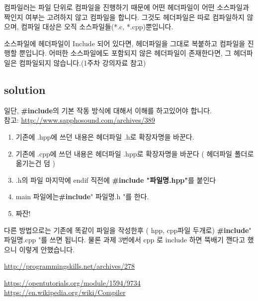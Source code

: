 \documentclass{oblivoir}
\begin{document}
컴파일러는 파일 단위로 컴파일을 진행하기 때문에 어떤 헤더파일이 어떤 소스파일과 짝인지 여부는 고려하지 않고 컴파일을 합니다. 그것도 헤더파일은 따로 컴파일하지 않으며, 컴파일 대상은 오직 소스파일들(*.c, *.cpp)뿐입니다.\par

소스파일에 헤더파일이 Include 되어 있다면, 헤더파일을 그대로 복붙하고 컴파일을 진행할 뿐입니다. 어떠한 소스파일에도 포함되지 않은 헤더파일이 존재한다면, 그 헤더파일은 컴파일되지 않습니다.(1주차 강의자료 참고)

\subsection{solution}
일단, \textbf{\#include}의 기본 작동 방식에 대해서 이해를 하고있어야 합니다. \\
참고: \url{http://www.sapphosound.com/archives/389}
\begin{enumerate}
    \item 기존에 .hpp에 쓰던 내용은 헤더파일 .h로 확장자명을 바꾼다.
    \item 기존에 .cpp에 쓰던 내용은 헤더파일 .hpp로 확장자명을 바꾼다 ( 헤더파일 폴더로 옮기는건 덤 )
    \item .h의 파일 마지막에 endif 직전에 \textbf{\#include "파일명.hpp"}를 붙인다
    \item  main 파일에는\textbf{\#include}" 파일명.h "를 한다.
    \item 짜잔!
\end{enumerate}
다른 방법으로는 기존에 똑같이 파일을 작성한후 ( hpp, cpp파일 두개로) \textbf{\#include}" 파일명.cpp "를 쓰면 됩니다.
물론 과제 3번에서 cpp 로 include 하면 뚝배기 깬다고 했으니 이렇게 안했습니다.


\url{http://programmingskills.net/archives/278}


\url{https://opentutorials.org/module/1594/9734}
\url{https://en.wikipedia.org/wiki/Compiler}
\end{document}
